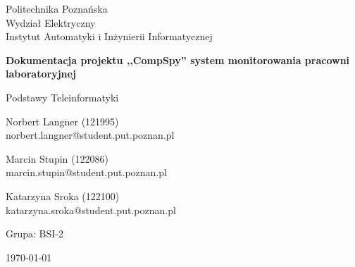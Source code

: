 \begin{titlepage}
	\centering
	{\Large Politechnika Poznańska\\
		Wydział Elektryczny\\
		Instytut Automatyki i Inżynierii Informatycznej\par}
	
	\vspace{3.0cm}
	{\LARGE\bfseries Dokumentacja projektu ,,CompSpy''
		system monitorowania pracowni laboratoryjnej}\\
		{\Large Podstawy Teleinformatyki\par}	
	\vspace{3.0cm}
	{\Large Norbert Langner (121995)\\
		norbert.langner@student.put.poznan.pl\par}
	\vspace{0.25cm}
	{\Large Marcin Stupin (122086)\\
	    marcin.stupin@student.put.poznan.pl\par}
	\vspace{0.25cm}
	{\Large Katarzyna Sroka (122100)\\
		katarzyna.sroka@student.put.poznan.pl\par}
	\vspace{0.5cm}
	{Grupa: BSI-2}
	\vfill
	
	{\large \today\par}
\end{titlepage}